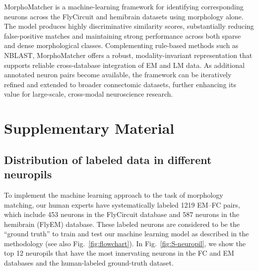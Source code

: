 \documentclass[10pt,a4paper]{article}
\renewcommand{\thesection}{\Roman{section}}
\begin{document}
MorphoMatcher is a machine-learning framework for identifying corresponding
neurons across the FlyCircuit and hemibrain datasets using morphology alone. The
model produces highly discriminative similarity scores, substantially reducing
false-positive matches and maintaining strong performance across both sparse and
dense morphological classes. Complementing rule-based methods such as NBLAST,
MorphoMatcher offers a robust, modality-invariant representation that supports
reliable cross-database integration of EM and LM data. As additional annotated
neuron pairs become available, the framework can be iteratively refined and
extended to broader connectomic datasets, further enhancing its value for
large-scale, cross-modal neuroscience research.






\clearpage
\appendix
\setcounter{figure}{0}
\renewcommand{\thefigure}{S\arabic{figure}}
\setcounter{section}{0}
\renewcommand{\thesection}{S\arabic{section}}

\section*{\centering Supplementary Material}

\subsection*{Distribution of labeled data in different neuropils}

To implement the machine learning approach to the task of morphology matching,
our human experts have systematically labeled 1219 EM--FC pairs, which include
453 neurons in the FlyCircuit database and 587 neurons in the hemibrain (FlyEM)
database. These labeled neurons are considered to be the ``ground truth'' to
train and test our machine learning model as described in the methodology (see
also Fig.~\ref{fig:flowchart}). In Fig.~\ref{fig:S-neuropil}, we show the top 12
neuropils that have the most innervating neurons in the FC and EM databases and
the human-labeled ground-truth dataset.
\end{document}
